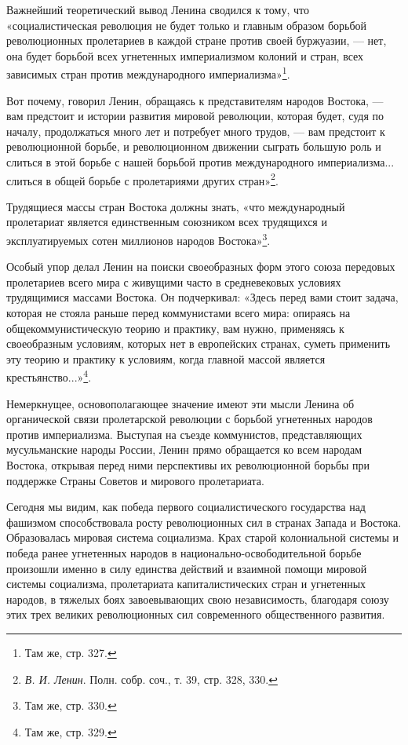 \documentclass[12pt, a4paper, openany]{book}
\begin{document}
Важнейший теоретический вывод Ленина сводился к тому, что «социалистическая революция не будет только и главным образом борьбой революционных пролетариев в каждой стране против своей буржуазии, — нет, она будет борьбой всех угнетенных империализмом колоний и стран, всех зависимых стран против международного империализма»\footnote{Там же, стр. 327.}.

Вот почему, говорил Ленин, обращаясь к представителям народов Востока, — вам предстоит и истории развития мировой революции, которая будет, судя по началу, продолжаться много лет и потребует много трудов, — вам предстоит к революционной борьбе, и революционном движении сыграть большую роль и слиться в этой борьбе с нашей борьбой против международного империализма... слиться в общей борьбе с пролетариями других стран»\footnote{\textit{В. И. Ленин}. Полн. собр. соч., т. 39, стр. 328, 330.}.

Трудящиеся массы стран Востока должны знать, «что международный пролетариат является единственным союзником всех трудящихся и эксплуатируемых сотен миллионов народов Востока»\footnote{Там же, стр. 330.}.

Особый упор делал Ленин на поиски своеобразных форм этого союза передовых пролетариев всего мира с живущими часто в средневековых условиях трудящимися массами Востока. Он подчеркивал: «Здесь перед вами стоит задача, которая не стояла раньше перед коммунистами всего мира: опираясь на общекоммунистическую теорию и практику, вам нужно, применяясь к своеобразным условиям, которых нет в европейских странах, суметь применить эту теорию и практику к условиям, когда главной массой является крестьянство...»\footnote{Там же, стр. 329.}.

Немеркнущее, основополагающее значение имеют эти мысли Ленина об органической связи пролетарской революции с борьбой угнетенных народов против империализма. Выступая на съезде коммунистов, представляющих мусульманские народы России, Ленин прямо обращается ко всем народам Востока, открывая перед ними перспективы их революционной борьбы при поддержке Страны Советов и мирового пролетариата.

Сегодня мы видим, как победа первого социалистического государства над фашизмом способствовала росту революционных сил в странах Запада и Востока. Образовалась мировая система социализма. Крах старой колониальной системы и победа ранее угнетенных народов в национально-освободительной борьбе произошли именно в силу единства действий и взаимной помощи мировой системы социализма, пролетариата капиталистических стран и угнетенных народов, в тяжелых боях завоевывающих свою независимость, благодаря союзу этих трех великих революционных сил современного общественного развития.
\end{document}
